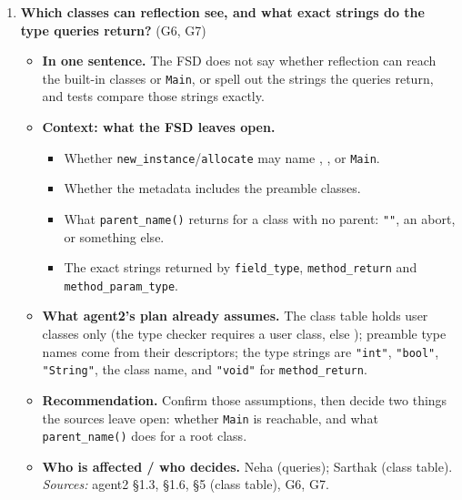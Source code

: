 \documentclass[10pt]{article}
\newcommand{\code}[1]{\texttt{\small #1}}
\newcommand{\field}[1]{\textbf{#1}\enspace}
\newcommand{\decitem}[1]{\needspace{6\baselineskip}\setcounter{enumi}{\numexpr#1-1\relax}\item}
\begin{document}
\begin{enumerate}[label=\textbf{\arabic*.},ref=\arabic*,leftmargin=1.8em,itemsep=0.8em]
\decitem{11}\label{dec:visible}\textbf{Which classes can reflection see, and what exact strings do the type queries return?} (G6, G7)
\begin{itemize}
\item[] \field{In one sentence.} The FSD does not say whether reflection can reach the built-in classes or \code{Main}, or spell out the strings the queries return, and tests compare those strings exactly.
\item[] \field{Context: what the FSD leaves open.}
\begin{itemize}
\item Whether \code{new\_instance}/\code{allocate} may name , ,  or \code{Main}.
\item Whether the metadata includes the preamble classes.
\item What \code{parent\_name()} returns for a class with no parent: \code{""}, an abort, or something else.
\item The exact strings returned by \code{field\_type}, \code{method\_return} and \code{method\_param\_type}.
\end{itemize}
\item[] \field{What agent2's plan already assumes.} The class table holds user classes only (the type checker requires a user class, else ); preamble type names come from their descriptors; the type strings are \code{"int"}, \code{"bool"}, \code{"String"}, the class name, and \code{"void"} for \code{method\_return}.
\item[] \field{Recommendation.} Confirm those assumptions, then decide two things the sources leave open: whether \code{Main} is reachable, and what \code{parent\_name()} does for a root class.
\item[] \field{Who is affected / who decides.} Neha (queries); Sarthak (class table). \emph{Sources:} agent2 §1.3, §1.6, §5 (class table), G6, G7.
\end{itemize}


\end{enumerate}
\end{document}
